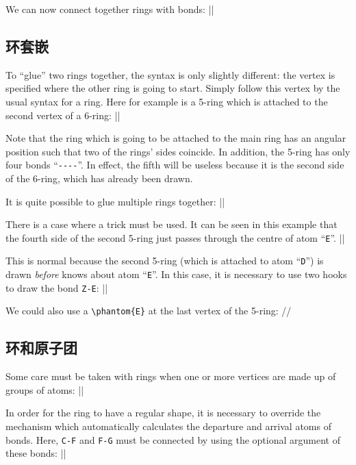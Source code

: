 \documentclass[10pt]{article}
\begin{document}
We can now connect together rings with bonds:
||

\subsection{环套嵌}
To ``glue'' two rings together, the syntax is only slightly different: the vertex is specified where the other ring is going to start. Simply follow this vertex by the usual syntax for a ring. Here for example is a 5-ring which is attached to the second vertex of a 6-ring:
||

Note that the ring which is going to be attached to the main ring has an angular position such that two of the rings' sides coincide. In addition, the 5-ring has only four bonds ``\verb/----/''. In effect, the fifth will be useless because it is the second side of the 6-ring, which has already been drawn.

It is quite possible to glue multiple rings together:
||

There is a case where a trick must be used. It can be seen in this example that the fourth side of the second 5-ring just passes through the centre of atom ``\verb-E-''.
||

This is normal because the second 5-ring (which is attached to atom ``\verb-D-'') is drawn \emph{before} \CF knows about atom ``\verb-E-''. In this case, it is necessary to use two hooks to draw the bond \verb/Z-E/:
||

We could also use a \verb-\phantom{E}- at the last vertex of the 5-ring:
//

\subsection{环和原子团}
Some care must be taken with rings when one or more vertices are made up of groups of atoms:
||

In order for the ring to have a regular shape, it is necessary to override the \CF mechanism which automatically calculates the departure and arrival atoms of bonds. Here, \verb/C-F/ and \verb/F-G/ must be connected by using the optional argument of these bonds:
||
\end{document}

